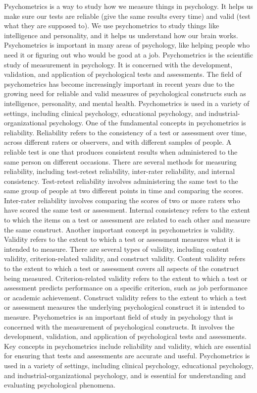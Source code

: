\documentclass[12pt, a4paper]{exam}
\begin{document}
Psychometrics is a way to study how we measure things in psychology. It helps us make sure our tests are reliable (give the same results every time) and valid (test what they are supposed to). We use psychometrics to study things like intelligence and personality, and it helps us understand how our brain works. Psychometrics is important in many areas of psychology, like helping people who need it or figuring out who would be good at a job. Psychometrics is the scientific study of measurement in psychology. It is concerned with the development, validation, and application of psychological tests and assessments. The field of psychometrics has become increasingly important in recent years due to the growing need for reliable and valid measures of psychological constructs such as intelligence, personality, and mental health. Psychometrics is used in a variety of settings, including clinical psychology, educational psychology, and industrial-organizational psychology. One of the fundamental concepts in psychometrics is reliability. Reliability refers to the consistency of a test or assessment over time, across different raters or observers, and with different samples of people. A reliable test is one that produces consistent results when administered to the same person on different occasions. There are several methods for measuring reliability, including test-retest reliability, inter-rater reliability, and internal consistency. Test-retest reliability involves administering the same test to the same group of people at two different points in time and comparing the scores. Inter-rater reliability involves comparing the scores of two or more raters who have scored the same test or assessment. Internal consistency refers to the extent to which the items on a test or assessment are related to each other and measure the same construct. Another important concept in psychometrics is validity. Validity refers to the extent to which a test or assessment measures what it is intended to measure. There are several types of validity, including content validity, criterion-related validity, and construct validity. Content validity refers to the extent to which a test or assessment covers all aspects of the construct being measured. Criterion-related validity refers to the extent to which a test or assessment predicts performance on a specific criterion, such as job performance or academic achievement. Construct validity refers to the extent to which a test or assessment measures the underlying psychological construct it is intended to measure. Psychometrics is an important field of study in psychology that is concerned with the measurement of psychological constructs. It involves the development, validation, and application of psychological tests and assessments. Key concepts in psychometrics include reliability and validity, which are essential for ensuring that tests and assessments are accurate and useful. Psychometrics is used in a variety of settings, including clinical psychology, educational psychology, and industrial-organizational psychology, and is essential for understanding and evaluating psychological phenomena.
\end{document}
